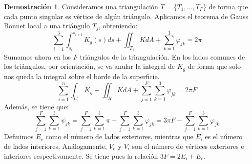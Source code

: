 \documentclass[twoside]{report}
\theoremstyle{definition}
\newtheorem*{dem}{Demostración}
\numberwithin{equation}{section}
\begin{document}
\begin{dem}
Consideramos una triangulación $T=\{T_1,\dotsc,T_F\}$ de forma que cada punto singular es vértice de algún triángulo. Aplicamos el teorema de Gauss Bonnet local a una triángulo $T_j$, obteniendo:
\[
\sum_{i=1}^3 \int_{s_i}^{s_{i+1}} K_g(s)ds + \iint_{T_j}KdA + \sum_{k=1}^3 \varphi_{jk} = 2\pi
\]
Sumamos ahora en los $F$ triángulos de la triangulación. En los lados comunes de los triángulos, por orientación, se va anular la integral de $K_g$ de forma que solo nos queda la integral sobre el borde de la superficie.
\[
\sum_{i=1}^n \int_{C_i}K_g + \iint_R K dA + \sum_{j=1}^F\sum_{k=1}^3 \varphi_{jk} = 2\pi F
\]
Además, se tiene que:
\[
\sum_{j=1}^F\sum_{k=1}^3 \psi_{jk} = \sum_{j=1}^F\sum_{k=1}^3 \pi -  \sum_{j=1}^F\sum_{k=1}^3 \varphi_{jk} = 3\pi F - \sum_{j=1}^F\sum_{k=1}^3 \varphi_{jk}
\]
Definimos $E_e$ como el número de lados exteriores, mientras que $E_i$ es el número de lados interiores. Análogamente, $V_e$ y $V_i$ son el número de vértices exteriores e interiores respectivamente. Se tiene pues la relación $3F = 2E_i + E_e$.


\end{dem}
\end{document}
